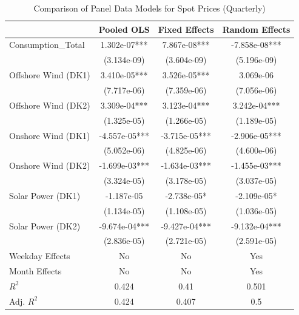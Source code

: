 \begin{table}[h]
\centering
\caption{Comparison of Panel Data Models for Spot Prices (Quarterly)}
\label{tab:model_results_quarterly}
\begin{tabular}{lccc}
\toprule
 & \textbf{Pooled OLS} & \textbf{Fixed Effects} & \textbf{Random Effects} \\
\midrule

Consumption_Total & 1.302e-07*** & 7.867e-08*** & -7.858e-08*** \\
                   & (3.134e-09) & (3.604e-09) & (5.196e-09) \\

Offshore Wind (DK1) & 3.410e-05*** & 3.526e-05*** & 3.069e-06 \\
                   & (7.717e-06) & (7.359e-06) & (7.056e-06) \\

Offshore Wind (DK2) & 3.309e-04*** & 3.123e-04*** & 3.242e-04*** \\
                   & (1.325e-05) & (1.266e-05) & (1.189e-05) \\

Onshore Wind (DK1) & -4.557e-05*** & -3.715e-05*** & -2.906e-05*** \\
                   & (5.052e-06) & (4.825e-06) & (4.600e-06) \\

Onshore Wind (DK2) & -1.699e-03*** & -1.634e-03*** & -1.455e-03*** \\
                   & (3.324e-05) & (3.178e-05) & (3.037e-05) \\

Solar Power (DK1) & -1.187e-05 & -2.738e-05* & -2.109e-05* \\
                   & (1.134e-05) & (1.108e-05) & (1.036e-05) \\

Solar Power (DK2) & -9.674e-04*** & -9.427e-04*** & -9.132e-04*** \\
                   & (2.836e-05) & (2.721e-05) & (2.591e-05) \\

\midrule
Weekday Effects & No & No & Yes \\
Month Effects & No & No & Yes \\

\midrule
$R^2$ & 0.424 & 0.41 & 0.501 \\
Adj. $R^2$ & 0.424 & 0.407 & 0.5 \\
\bottomrule
\end{tabular}
\end{table}

